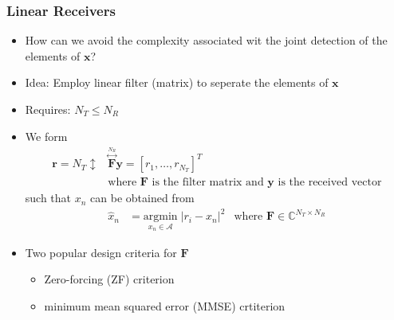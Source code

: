 \documentclass[a4paper, 10pt]{article}
\begin{document}
\subsubsection{Linear Receivers}
\begin{itemize}
	\item How can we avoid the complexity associated wit the joint detection of the elements of $\mathbf{x}$?
	\item Idea: Employ linear filter (matrix) to seperate  the elements of $\mathbf{x}$
	\item Requires: $N_T \leq N_R$
	\item We form
	\begin{align*}
		\mathbf{r}=N_T\updownarrow &\overset{\overset{N_R}{\longleftrightarrow}}{\mathbf{F}}\mathbf{y}=[r_1,\dots,r_{N_T}]^T\\
	&\text{where $\mathbf{F}$ is the filter matrix and $\mathbf{y}$ is the received vector}
	\end{align*}
	such that $x_n$ can be obtained from
	\begin{align*}
		\hat{x}_n&=\underset{x_n \in \mathscr{A}}{\mathrm{argmin}} \; |r_i-x_n|^2
		&\text{where } \mathbf{F} \in \mathds{C}^{N_T\times N_R}
	\end{align*}
	\item Two popular design criteria for $\mathbf{F}$
	\begin{itemize}
		\item Zero-forcing (ZF) criterion
		\item minimum mean squared error (MMSE) crtiterion
	\end{itemize}
\end{itemize}
\end{document}
